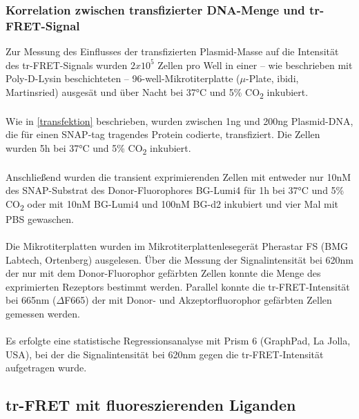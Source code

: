 \subsubsection{Korrelation zwischen transfizierter DNA-Menge und tr-FRET-Signal}
Zur Messung des Einflusses der transfizierten Plasmid-Masse auf die Intensität des tr-FRET-Signals wurden $2x10^5$ Zellen pro Well in einer -- wie beschrieben mit Poly-D-Lysin beschichteten -- 96-well-Mikrotiterplatte ($\mu$-Plate, ibidi, Martinsried) ausgesät und über Nacht bei 37\si{\celsius} und 5\% CO\textsubscript{2} inkubiert.
\\ \\
Wie in \ref{transfektion} beschrieben, wurden zwischen 1\si{\nano\gram} und 200\si{\nano\gram} Plasmid-DNA, die für einen SNAP-tag tragendes Protein codierte, transfiziert. Die Zellen wurden 5\si{\hour} bei 37\si{\celsius} und 5\% CO\textsubscript{2} inkubiert.
\\ \\
Anschließend wurden die transient exprimierenden Zellen mit entweder nur 10\si{\nano M} des SNAP-Substrat des Donor-Fluorophores BG-Lumi4 für 1\si{\hour} bei 37\si{\celsius} und 5\% CO\textsubscript{2} oder mit 10\si{\nano M} BG-Lumi4 und 100\si{\nano M} BG-d2 inkubiert und vier Mal mit PBS gewaschen.
\\ \\
Die Mikrotiterplatten wurden im Mikrotiterplattenlesegerät Pherastar FS (BMG Labtech, Ortenberg) ausgelesen. Über die Messung der Signalintensität bei 620\si{\nano\meter} der nur mit dem Donor-Fluorophor gefärbten Zellen konnte die Menge des exprimierten Rezeptors bestimmt werden. Parallel konnte die tr-FRET-Intensität bei 665\si{\nano\meter} ($\Delta$F665) der mit Donor- und Akzeptorfluorophor gefärbten Zellen gemessen werden.
\\ \\
Es erfolgte eine statistische Regressionsanalyse mit Prism 6 (GraphPad, La Jolla, USA), bei der die Signalintensität bei 620\si{\nano\meter} gegen die tr-FRET-Intensität aufgetragen wurde.

\subsection{tr-FRET mit fluoreszierenden Liganden}
